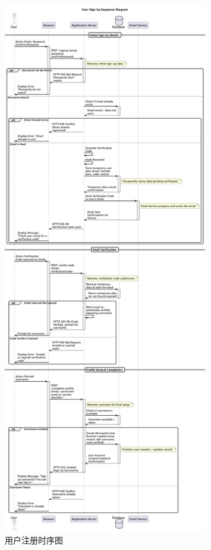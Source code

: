\documentclass[
    report,     %
    oneside,    %
    UTF8,       %
    zihao=-4    %
]{config} %
\begin{document}
\begin{enumerate}[label=(\arabic*)]
\begin{figure}[H]
        \includegraphics[width=0.8\textwidth]{UML/Squence/signup.png}
        \caption{用户注册时序图}
        \label{fig:UserSignupSequenceDiagram}
    \end{figure}
\end{enumerate}
\end{document}
